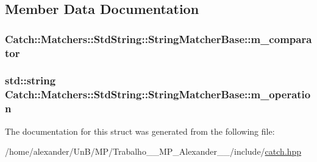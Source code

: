 \subsection{Member Data Documentation}
\hypertarget{structCatch_1_1Matchers_1_1StdString_1_1StringMatcherBase_a17c9f0fe40587070ffe998c193742831}{
\subsubsection[{m\-\_\-comparator}]{ Catch\-::\-Matchers\-::\-Std\-String\-::\-String\-Matcher\-Base\-::m\-\_\-comparator}}\label{structCatch_1_1Matchers_1_1StdString_1_1StringMatcherBase_a17c9f0fe40587070ffe998c193742831}
\hypertarget{structCatch_1_1Matchers_1_1StdString_1_1StringMatcherBase_a7a25c4b7d863e9a1c406d81efd0f83ca}{
\subsubsection[{m\-\_\-operation}]{\setlength{\rightskip}{0pt plus 5cm}std\-::string Catch\-::\-Matchers\-::\-Std\-String\-::\-String\-Matcher\-Base\-::m\-\_\-operation}}\label{structCatch_1_1Matchers_1_1StdString_1_1StringMatcherBase_a7a25c4b7d863e9a1c406d81efd0f83ca}


The documentation for this struct was generated from the following file\-:\begin{DoxyCompactItemize}
\item 
/home/alexander/\-Un\-B/\-M\-P/\-Trabalho\-\_\-\_\-\-M\-P\-\_\-\-Alexander\-\_\-\_/include/\hyperlink{catch_8hpp}{catch.\-hpp}\end{DoxyCompactItemize}
